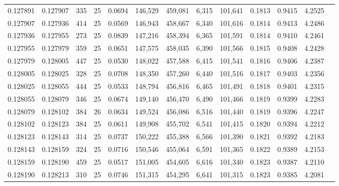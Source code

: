 \begin{tabular}{rrrrrrrrrrrrr}
0.127891 & 0.127907 &   335 &  25 &                                     0.0694 & 146,529 & 459,081 &   6,315 & 101,641 & 0.1813 & 0.9415 & 4.2525 \\
0.127907 & 0.127936 &   414 &  25 &                                     0.0569 & 146,943 & 458,667 &   6,340 & 101,616 & 0.1814 & 0.9413 & 4.2486 \\
0.127936 & 0.127955 &   273 &  25 &                                     0.0839 & 147,216 & 458,394 &   6,365 & 101,591 & 0.1814 & 0.9410 & 4.2461 \\
0.127955 & 0.127979 &   359 &  25 &                                     0.0651 & 147,575 & 458,035 &   6,390 & 101,566 & 0.1815 & 0.9408 & 4.2428 \\
0.127979 & 0.128005 &   447 &  25 &                                     0.0530 & 148,022 & 457,588 &   6,415 & 101,541 & 0.1816 & 0.9406 & 4.2387 \\
0.128005 & 0.128025 &   328 &  25 &                                     0.0708 & 148,350 & 457,260 &   6,440 & 101,516 & 0.1817 & 0.9403 & 4.2356 \\
0.128025 & 0.128055 &   444 &  25 &                                     0.0533 & 148,794 & 456,816 &   6,465 & 101,491 & 0.1818 & 0.9401 & 4.2315 \\
0.128055 & 0.128079 &   346 &  25 &                                     0.0674 & 149,140 & 456,470 &   6,490 & 101,466 & 0.1819 & 0.9399 & 4.2283 \\
0.128079 & 0.128102 &   384 &  26 &                                     0.0634 & 149,524 & 456,086 &   6,516 & 101,440 & 0.1819 & 0.9396 & 4.2247 \\
0.128102 & 0.128123 &   384 &  25 &                                     0.0611 & 149,908 & 455,702 &   6,541 & 101,415 & 0.1820 & 0.9394 & 4.2212 \\
0.128123 & 0.128143 &   314 &  25 &                                     0.0737 & 150,222 & 455,388 &   6,566 & 101,390 & 0.1821 & 0.9392 & 4.2183 \\
0.128143 & 0.128159 &   324 &  25 &                                     0.0716 & 150,546 & 455,064 &   6,591 & 101,365 & 0.1822 & 0.9389 & 4.2153 \\
0.128159 & 0.128190 &   459 &  25 &                                     0.0517 & 151,005 & 454,605 &   6,616 & 101,340 & 0.1823 & 0.9387 & 4.2110 \\
0.128190 & 0.128213 &   310 &  25 &                                     0.0746 & 151,315 & 454,295 &   6,641 & 101,315 & 0.1823 & 0.9385 & 4.2081 \\

\end{tabular}
